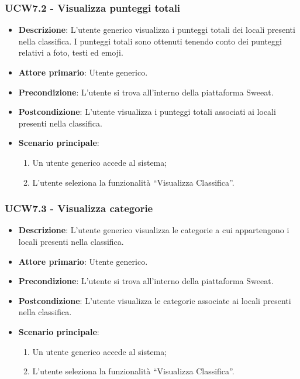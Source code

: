 \subsubsection{UCW7.2 - Visualizza punteggi totali}
\begin{itemize}
	\item \textbf{Descrizione}: L'utente generico visualizza i punteggi totali dei locali presenti nella classifica. I punteggi totali sono ottenuti tenendo conto dei punteggi relativi a foto, testi ed emoji.
    \item \textbf{Attore primario}: Utente generico.
    \item \textbf{Precondizione}: L’utente si trova all’interno della piattaforma Sweeat.
    \item \textbf{Postcondizione}: L’utente visualizza i punteggi totali associati ai locali presenti nella classifica.
    \item \textbf{Scenario principale}: 
    \begin{enumerate}
        \item Un utente generico accede al sistema;
        \item L’utente seleziona la funzionalità “Visualizza Classifica”.
    \end{enumerate}
\end{itemize}

\subsubsection{UCW7.3 - Visualizza categorie}
\begin{itemize}
	\item \textbf{Descrizione}: L'utente generico visualizza le categorie a cui appartengono i locali presenti nella classifica.
    \item \textbf{Attore primario}: Utente generico.
    \item \textbf{Precondizione}: L’utente si trova all’interno della piattaforma Sweeat.
    \item \textbf{Postcondizione}: L’utente visualizza le categorie associate ai locali presenti nella classifica.
    \item \textbf{Scenario principale}: 
    \begin{enumerate}
        \item Un utente generico accede al sistema;
        \item L’utente seleziona la funzionalità “Visualizza Classifica”.
    \end{enumerate}
\end{itemize}

